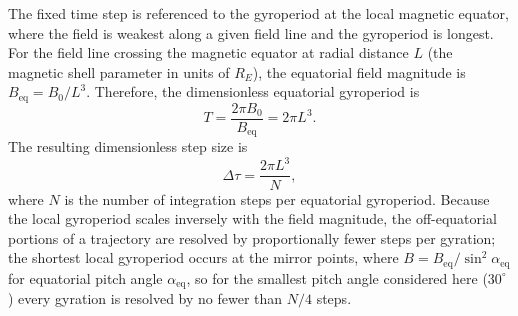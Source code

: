 \documentclass[draft]{agujournal2019}
\begin{document}
The fixed time step is referenced to the gyroperiod at the local magnetic equator, where the field is weakest along a given field line and the gyroperiod is longest. For the field line crossing the magnetic equator at radial distance $L$ (the magnetic shell parameter in units of $R_E$), the equatorial field magnitude is $B_{\mathrm{eq}} = B_0/L^3$. Therefore, the dimensionless equatorial gyroperiod is
        \begin{equation*}
            T = \frac{2\pi B_0}{B_{\mathrm{eq}}} = 2\pi L^3.
        \end{equation*}
The resulting dimensionless step size is
        \begin{equation}
            \Delta \tau = \frac{2\pi L^3}{N},
            \label{eqn: dipole tau}
        \end{equation}
where $N$ is the number of integration steps per equatorial gyroperiod. Because the local gyroperiod scales inversely with the field magnitude, the off-equatorial portions of a trajectory are resolved by proportionally fewer steps per gyration; the shortest local gyroperiod occurs at the mirror points, where $B = B_{\mathrm{eq}}/\sin^2\alpha_{\mathrm{eq}}$ for equatorial pitch angle $\alpha_{\mathrm{eq}}$, so for the smallest pitch angle considered here ($30^\circ$) every gyration is resolved by no fewer than $N/4$ steps.
\end{document}
